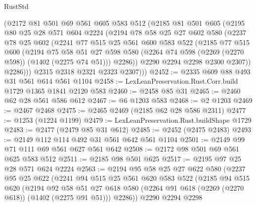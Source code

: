 \begin{lexlean}{RustStd}
\begin{coremodule}
        (@2172
          @81
          @501
          @69
          @561
          @605
          @583
          @512
          (@2185
            @81
            @501
            @605
            (@2195
              @80
              @25
              @28
              @571
              @604
              @2224
              (@2194
                @78
                @58
                @25
                @27
                @602
                @580
                (@2237
                  @78
                  @25
                  @602
                  (@2241
                    @77
                    @515
                    @25
                    @561
                    @600
                    @583
                    @522
                    (@2185
                      @77
                      @515
                      @600
                      (@2194
                        @75
                        @58
                        @51
                        @27
                        @598
                        @580
                        (@2264 @74 @598 (@2269 (@2270 @598)) (@1402 (@2275 @74 @51)))
                        @2286))
                    @2290
                    @2294
                    @2298
                    @2300
                    @2307))
                @2286)))
          @2315
          @2318
          @2321
          @2323
          @2307)))
@2452 := @2335 @609 @88 @493 @31 @561 @614 @561 @1104
@2458 := LexLeanPreservation.Rust.Corr.build @1729 @1365 @1841 @2120 @583
@2460 := @2458 @85 @31
@2465 := @2460 @62 @28 @561 @586 @612
@2467 := @6 @1203 @583
@2468 := @2 @1203
@2469 := @2467 @2468
@2475 := @2465 @2469 (@2185 @62 @28 @586 @2311)
@2477 := @1253 (@1224 @1199)
@2479 := LexLeanPreservation.Rust.buildShape @1729
@2483 := @2477 (@2479 @85 @31 @612)
@2485 := @2452 (@2475 @2483)
@2493 := @2149 @112 @114 @492 @31 @561 @642 @561 @1104
@2501 := @2149 @99 @71 @111 @69 @561 @627 @561 @642
@2508 := @2172 @98 @501 @69 @561 @625 @583 @512
@2511 := @2185 @98 @501 @625
@2517 := @2195 @97 @25 @28 @571 @624 @2224
@2563 := @2194
    @95
    @58
    @25
    @27
    @622
    @580
    (@2237
      @95
      @25
      @622
      (@2241
        @94
        @515
        @25
        @561
        @620
        @583
        @522
        (@2185
          @94
          @515
          @620
          (@2194
            @92
            @58
            @51
            @27
            @618
            @580
            (@2264 @91 @618 (@2269 (@2270 @618)) (@1402 (@2275 @91 @51)))
            @2286))
        @2290
        @2294
        @2298

\end{coremodule}
\end{lexlean}
